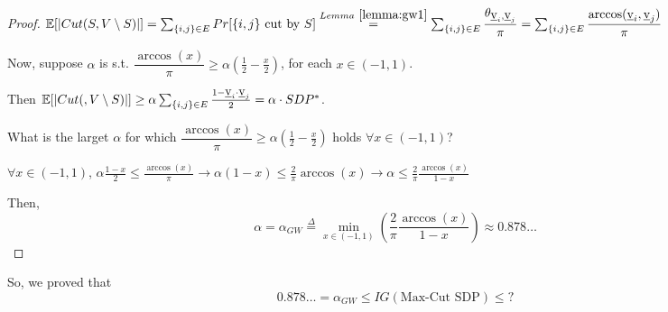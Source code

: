     \begin{proof}
        $\mathbb{E}[\vert Cut(S,V \setminus S) \vert] =
        \sum_{\{i,j\} \in E} Pr[\{i,j\} \text{ cut by } S] \overset{Lemma~\ref{lemma:gw1}}{=}
        \sum_{\{i,j\} \in E} \dfrac{\theta_{\underbar{v}_i,\underbar{v}_j}}{\pi} = 
        \sum_{\{i,j\} \in E} \dfrac{\arccos(\underbar{v}_i, \underbar{v}_j)}{\pi}$

        Now, suppose $\alpha$ is s.t.  $\dfrac{\arccos(x)}{\pi} \geq \alpha (\frac{1}{2} - \frac{x}{2})$, for each $x \in (-1,1)$.

        Then $\mathbb{E}[\vert Cut(, V \setminus S) \vert] \geq \alpha \sum_{\{i,j\} \in E} \frac{1 - \underbar{v}_i \cdot \underbar{v}_j}{2} = \alpha \cdot SDP^*$.

        What is the larget $\alpha$ for which $\dfrac{\arccos(x)}{\pi} \geq \alpha (\frac{1}{2} - \frac{x}{2})$ holds $\forall x \in (-1,1)$?

        $\forall x \in (-1,1)$,
        $\alpha  \frac{1-x}{2} \leq \frac{\arccos(x)}{\pi} \rightarrow
        \alpha (1-x) \leq \frac{2}{\pi} \arccos(x) \rightarrow
        \alpha \leq \frac{2}{\pi} \frac{\arccos(x)}{1-x}$

        Then,
        \[ \alpha = \alpha_{GW} \overset{\Delta}{=} \min_{x \in (-1,1)} (\frac{2}{\pi} \frac{\arccos(x)}{1-x}) \approx 0.878\dots \]
    \end{proof}

    So, we proved that
    \[ 0.878\dots = \alpha_{GW} \leq IG (\text{Max-Cut SDP}) \leq ? \]